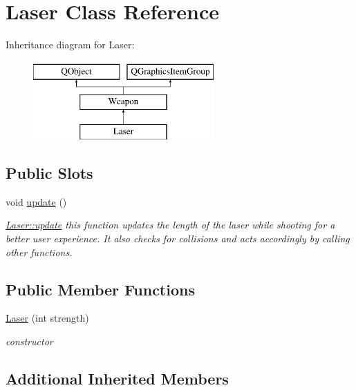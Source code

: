 \hypertarget{classLaser}{\section{Laser Class Reference}
\label{classLaser}
}
Inheritance diagram for Laser\-:\begin{figure}[H]
\begin{center}
\leavevmode
\includegraphics[height=3.000000cm]{classLaser}
\end{center}
\end{figure}
\subsection*{Public Slots}
\begin{DoxyCompactItemize}
\item 
void \hyperlink{classLaser_ae7317375cf2b7a5bff4281c359797255}{update} ()
\begin{DoxyCompactList}\small\item\em \hyperlink{classLaser_ae7317375cf2b7a5bff4281c359797255}{Laser\-::update} this function updates the length of the laser while shooting for a better user experience. It also checks for collisions and acts accordingly by calling other functions. \end{DoxyCompactList}\end{DoxyCompactItemize}
\subsection*{Public Member Functions}
\begin{DoxyCompactItemize}
\item 
\hypertarget{classLaser_a790db50423fe7ab34496b734210465c9}{\hyperlink{classLaser_a790db50423fe7ab34496b734210465c9}{Laser} (int strength)}\label{classLaser_a790db50423fe7ab34496b734210465c9}

\begin{DoxyCompactList}\small\item\em constructor \end{DoxyCompactList}\end{DoxyCompactItemize}
\subsection*{Additional Inherited Members}


